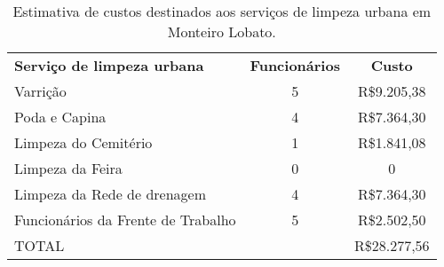 \begin{table}[htbp]
  \centering
  \caption{Estimativa de custos destinados aos serviços de limpeza urbana em Monteiro Lobato.}
    \begin{tabular}{p{13.93em}|c|c}
\cmidrule{2-2}    \rowcolor[rgb]{ .969,  .588,  .275} \textcolor[rgb]{ 1,  1,  1}{\textbf{Serviço de limpeza urbana}} & \multicolumn{1}{p{6.93em}|}{\textcolor[rgb]{ 1,  1,  1}{\textbf{Funcionários}}} & \multicolumn{1}{p{7.07em}}{\textcolor[rgb]{ 1,  1,  1}{\textbf{Custo}}} \\
    \rowcolor[rgb]{ .992,  .914,  .851} Varrição & 5     & R\$9.205,38 \\
    \rowcolor[rgb]{ .984,  .831,  .706} Poda e Capina & 4     & R\$7.364,30 \\
    \rowcolor[rgb]{ .992,  .914,  .851} Limpeza do Cemitério & 1     & R\$1.841,08 \\
    \rowcolor[rgb]{ .984,  .831,  .706} Limpeza da Feira & 0     & 0 \\
    \rowcolor[rgb]{ .992,  .914,  .851} Limpeza da Rede de drenagem & 4     & R\$7.364,30 \\
    \rowcolor[rgb]{ .984,  .831,  .706} Funcionários da Frente de Trabalho & 5     & R\$2.502,50 \\
    \rowcolor[rgb]{ .992,  .914,  .851} TOTAL &       & R\$28.277,56 \\
\cmidrule{2-2}    \end{tabular}%
  \label{tab:custo_slu}%
\end{table}%
